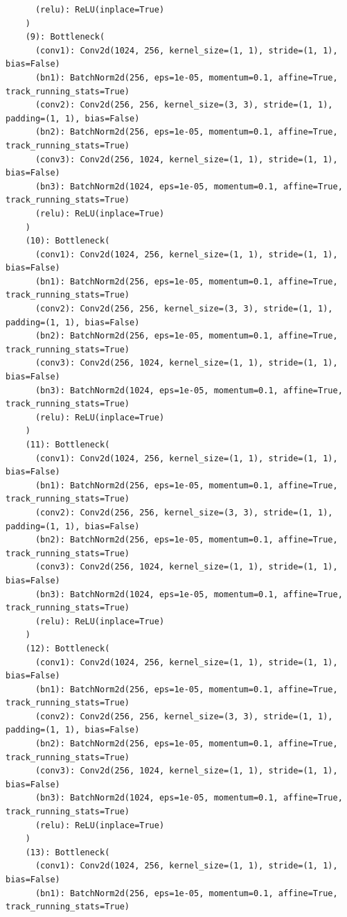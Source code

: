\documentclass{article}
\begin{document}
\begin{verbatim}
      (relu): ReLU(inplace=True)
    )
    (9): Bottleneck(
      (conv1): Conv2d(1024, 256, kernel_size=(1, 1), stride=(1, 1), bias=False)
      (bn1): BatchNorm2d(256, eps=1e-05, momentum=0.1, affine=True, track_running_stats=True)
      (conv2): Conv2d(256, 256, kernel_size=(3, 3), stride=(1, 1), padding=(1, 1), bias=False)
      (bn2): BatchNorm2d(256, eps=1e-05, momentum=0.1, affine=True, track_running_stats=True)
      (conv3): Conv2d(256, 1024, kernel_size=(1, 1), stride=(1, 1), bias=False)
      (bn3): BatchNorm2d(1024, eps=1e-05, momentum=0.1, affine=True, track_running_stats=True)
      (relu): ReLU(inplace=True)
    )
    (10): Bottleneck(
      (conv1): Conv2d(1024, 256, kernel_size=(1, 1), stride=(1, 1), bias=False)
      (bn1): BatchNorm2d(256, eps=1e-05, momentum=0.1, affine=True, track_running_stats=True)
      (conv2): Conv2d(256, 256, kernel_size=(3, 3), stride=(1, 1), padding=(1, 1), bias=False)
      (bn2): BatchNorm2d(256, eps=1e-05, momentum=0.1, affine=True, track_running_stats=True)
      (conv3): Conv2d(256, 1024, kernel_size=(1, 1), stride=(1, 1), bias=False)
      (bn3): BatchNorm2d(1024, eps=1e-05, momentum=0.1, affine=True, track_running_stats=True)
      (relu): ReLU(inplace=True)
    )
    (11): Bottleneck(
      (conv1): Conv2d(1024, 256, kernel_size=(1, 1), stride=(1, 1), bias=False)
      (bn1): BatchNorm2d(256, eps=1e-05, momentum=0.1, affine=True, track_running_stats=True)
      (conv2): Conv2d(256, 256, kernel_size=(3, 3), stride=(1, 1), padding=(1, 1), bias=False)
      (bn2): BatchNorm2d(256, eps=1e-05, momentum=0.1, affine=True, track_running_stats=True)
      (conv3): Conv2d(256, 1024, kernel_size=(1, 1), stride=(1, 1), bias=False)
      (bn3): BatchNorm2d(1024, eps=1e-05, momentum=0.1, affine=True, track_running_stats=True)
      (relu): ReLU(inplace=True)
    )
    (12): Bottleneck(
      (conv1): Conv2d(1024, 256, kernel_size=(1, 1), stride=(1, 1), bias=False)
      (bn1): BatchNorm2d(256, eps=1e-05, momentum=0.1, affine=True, track_running_stats=True)
      (conv2): Conv2d(256, 256, kernel_size=(3, 3), stride=(1, 1), padding=(1, 1), bias=False)
      (bn2): BatchNorm2d(256, eps=1e-05, momentum=0.1, affine=True, track_running_stats=True)
      (conv3): Conv2d(256, 1024, kernel_size=(1, 1), stride=(1, 1), bias=False)
      (bn3): BatchNorm2d(1024, eps=1e-05, momentum=0.1, affine=True, track_running_stats=True)
      (relu): ReLU(inplace=True)
    )
    (13): Bottleneck(
      (conv1): Conv2d(1024, 256, kernel_size=(1, 1), stride=(1, 1), bias=False)
      (bn1): BatchNorm2d(256, eps=1e-05, momentum=0.1, affine=True, track_running_stats=True)

\end{verbatim}
\end{document}
